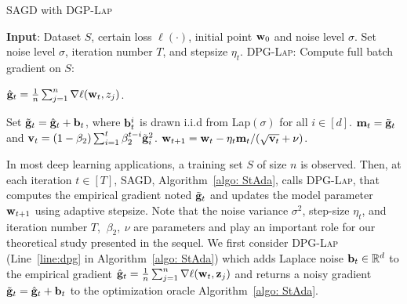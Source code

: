 \documentclass[11pt]{article}
\begin{document}
\begin{algorithm}[t] 
\caption{\textsc{SAGD} with \textsc{DGP-Lap}}
\begin{algorithmic}[1] \label{algo: StAda}
\STATE \textbf{Input}: Dataset $S$,  certain loss $\ell(\cdot)$, initial point $\mathbf{w}_0$ and noise level $\sigma$.
\STATE Set  noise level $\sigma$, iteration number $T$,  and stepsize $\eta_t$.
	\STATE  \textsc{DPG-Lap:} Compute full batch gradient on $S$: \\
	\centerline{ $\hat {\mathbf{g}}_t = \frac{1}{n} \sum_{j=1}^n\nabla \ell(\mathbf{w}_t, z_j)$.}	
	\STATE \label{line:dpg} Set $\tilde {\mathbf{g}}_t = \hat {\mathbf{g}}_t + \mathbf{b}_t$, where $\mathbf{b}_t^i$ is drawn i.i.d from Lap$(\sigma)$ for all $i \in [d]$.
\STATE  \label{line:adap1}
$\mathbf{m}_t = \tilde {\mathbf{g}}_t$ and $\mathbf{v}_t = \left(1-\beta_{2}\right) \sum_{i=1}^{t} \beta_{2}^{t-i} \tilde {\mathbf{g}}_{i}^{2}$.
\STATE  \label{line:adap2} $\mathbf{w}_{t+1}=\mathbf{w}_{t}-\eta_t \mathbf{m}_t /(\sqrt{\mathbf{v}_t}+\nu)$.
\ENDFOR 
\end{algorithmic}
\end{algorithm}
In most deep learning applications, a training set $S$ of size $n$ is observed.
Then, at each iteration $t \in [T]$, \textsc{SAGD}, Algorithm~\ref{algo: StAda}, calls \textsc{DPG-Lap}, that computes the empirical gradient noted $\tilde {\mathbf{g}}_t$ and updates the model parameter $\mathbf{w}_{t+1}$ using adaptive stepsize.
Note that the noise variance $\sigma^2$, step-size $\eta_t$, and iteration number $T$, $~ \beta_2,~\nu$ are parameters and play an important role for our theoretical study presented in the sequel. 
We first consider \textsc{DPG-Lap} (Line~\ref{line:dpg} in Algorithm~\ref{algo: StAda}) which adds Laplace noise $\mathbf{b}_t \in \mathbb{R}^d$ to the empirical gradient $\hat {\mathbf{g}}_t = \frac{1}{n} \sum_{j=1}^n\nabla \ell(\mathbf{w}_t, \mathbf{z}_j)$ and returns a noisy gradient $\tilde {\mathbf{g}}_t = \hat {\mathbf{g}}_t + \mathbf{b}_t$ to the optimization oracle Algorithm~\ref{algo: StAda}.
\end{document}

